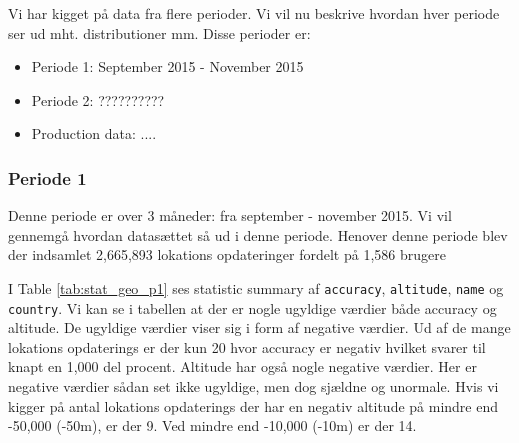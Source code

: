 Vi har kigget på data fra flere perioder. Vi vil nu beskrive hvordan hver periode ser ud mht. distributioner mm. Disse perioder er: 
\begin{itemize}
\item Periode 1: September 2015 - November 2015
\item Periode 2: ??????????
\item Production data: ....
\end{itemize}

\subsubsection{Periode 1}
Denne periode er over 3 måneder: fra september - november 2015. Vi vil gennemgå hvordan datasættet så ud i denne periode. 
Henover denne periode blev der indsamlet 2,665,893 lokations opdateringer fordelt på 1,586 brugere

I Table \ref{tab:stat_geo_p1} ses statistic summary af \texttt{accuracy}, \texttt{altitude}, \texttt{name} og \texttt{country}.
Vi kan se i tabellen at der er nogle ugyldige værdier både accuracy og altitude. De ugyldige værdier viser sig i form af negative værdier. Ud af de mange lokations opdaterings er der kun 20 hvor accuracy er negativ hvilket svarer til knapt en 1,000 del procent. Altitude har også nogle negative værdier. Her er negative værdier sådan set ikke ugyldige, men dog sjældne og unormale. Hvis vi kigger på antal lokations opdaterings der har en negativ altitude på mindre end -50,000 (-50m), er der 9. Ved mindre end -10,000 (-10m) er der 14.

